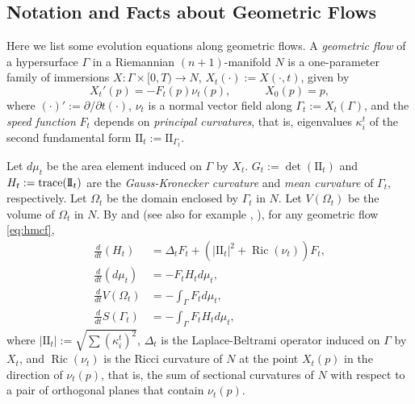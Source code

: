 \documentclass[11pt]{amsart}
\theoremstyle{definition}
\theoremstyle{remark}
\numberwithin{equation}{section}
\begin{document}
		
		\subsection{Notation and Facts about Geometric Flows}
		Here we list some evolution equations along geometric flows.
		A \emph{geometric flow}  of a hypersurface $\Gamma$ in a Riemannian $(n+1)$-manifold $N$ \cite{andrews-chow2020,giga2006,huisken-polden1999} is a one-parameter family of immersions $X\colon\Gamma\times[0,T)\to N$, $X_t(\cdot):=X(\cdot, t)$,  given by
		\begin{equation}\label{eq:hmcf}
			X_t'(p)=-F_t(p)\nu_t(p),\quad\quad\quad X_0(p)=p,   
		\end{equation}
		where $(\cdot)':=\partial/\partial t(\cdot)$,
		$\nu_t$ is a normal vector field along $\Gamma_t:=X_t(\Gamma)$, and the \emph{speed function} $F_t$ depends on \emph{principal curvatures}, that is, eigenvalues $\kappa_i^t$  of the second fundamental form $\mathrm{I\!I}_t:=\mathrm{I\!I}_{\Gamma_t}$. %
		
		Let $d\mu_t$ be the area element induced on $\Gamma$ by $X_t$. $G_t:=\det(\mathrm{I\!I}_t)$ and $H_t:=\textup{trace}(\mathrm{I\!I}_t)$ are the \emph{Gauss-Kronecker curvature} and \emph{mean curvature} of $\Gamma_t$, respectively. Let $\Omega_t$ be the domain enclosed by $\Gamma_t$ in $N$. Let $V(\Omega_t)$ be the volume of $\Omega_t$ in $N$.
		By \cite[Thm. 3.2(v)]{huisken-polden1999} and \cite[Lem. 7.4]{huisken-polden1999} (see also for example \cite{andrews1994}, \cite{ghomi-spruck2023}), for any geometric flow \eqref{eq:hmcf},
			\begin{align}
				\label{eq:evolution}
			\frac{d}{dt}(H_t) &= 
			\Delta_t F_t+\left(|\mathrm{I\!I}_t|^2+\operatorname{Ric}(\nu_t)\right)F_t,
			\\
			\nonumber
			\frac{d}{dt}(d\mu_t) &= -F_tH_td\mu_t,
			\\
			\nonumber
			\frac{d}{dt}V(\Omega_t) &= -\int_{\Gamma} F_t d\mu_t,
			\\
			\nonumber
			\frac{d}{dt} S(\Gamma_t) &= -\int_{\Gamma} F_t H_t d\mu_t,
		\end{align}
		where $|\mathrm{I\!I}_t|:=\sqrt{\sum(\kappa_i^t)^2}$, $\Delta_t$ is the Laplace-Beltrami operator induced on $\Gamma$ by $X_t$, and $\operatorname{Ric}(\nu_t)$ is the Ricci curvature of $N$ at the point $X_t(p)$ in the direction of $\nu_t(p)$, that is, the sum of sectional curvatures of $N$ with respect to a pair of orthogonal planes that contain $\nu_t(p)$.
		
\end{document}
